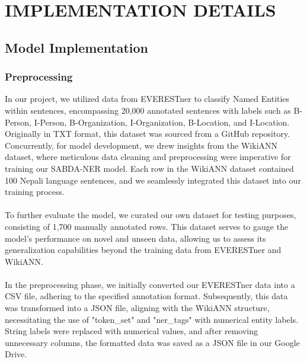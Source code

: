 \chapter{IMPLEMENTATION DETAILS}
\section{Model Implementation}
\vspace{10pt} %

\subsection{Preprocessing}
In our project, we utilized data from EVERESTner to classify Named Entities within sentences, encompassing 20,000 annotated sentences with labels such as B-Person, I-Person, B-Organization, I-Organization, B-Location, and I-Location. Originally in TXT format, this dataset was sourced from a GitHub repository. Concurrently, for model development, we drew insights from the WikiANN dataset, where meticulous data cleaning and preprocessing were imperative for training our SABDA-NER model. Each row in the WikiANN dataset contained 100 Nepali language sentences, and we seamlessly integrated this dataset into our training process.\\
\\
To further evaluate the model, we curated our own dataset for testing purposes, consisting of 1,700 manually annotated rows. This dataset serves to gauge the model's performance on novel and unseen data, allowing us to assess its generalization capabilities beyond the training data from EVERESTner and WikiANN.\\
\\
In the preprocessing phase, we initially converted our EVERESTner data into a CSV file, adhering to the specified annotation format. Subsequently, this data was transformed into a JSON file, aligning with the WikiANN structure, necessitating the use of "token\_set" and "ner\_tags" with numerical entity labels. String labels were replaced with numerical values, and after removing unnecessary columns, the formatted data was saved as a JSON file in our Google Drive.

